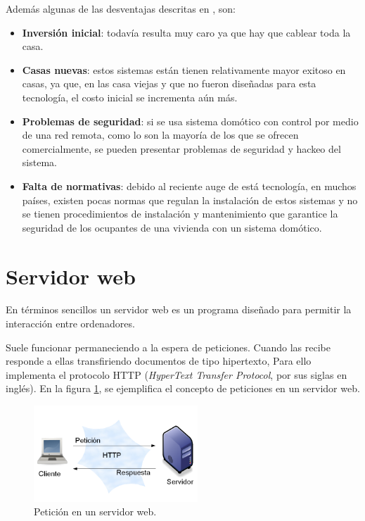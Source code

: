 Además algunas de las desventajas descritas en \cite{Madrid2007}, son:
\begin{itemize}
\item \textbf{Inversión inicial}: todavía resulta muy caro ya que hay que cablear toda la casa.
\item \textbf{Casas nuevas}: estos sistemas están tienen relativamente mayor exitoso en casas, ya que, en las casa viejas y que no fueron diseñadas para esta tecnología, el costo inicial se incrementa aún más. 
\item \textbf{Problemas de seguridad}: si se usa sistema domótico con control por medio de una red remota, como lo son la mayoría de los que se ofrecen comercialmente, se pueden presentar problemas de seguridad y hackeo del sistema.
\item \textbf{Falta de normativas}: debido al reciente auge de está tecnología, en muchos países, existen pocas normas que regulan la instalación de estos sistemas y no se tienen procedimientos de instalación y mantenimiento que garantice la seguridad de los ocupantes de una vivienda con un sistema domótico.
\end{itemize}

\section{Servidor web}

En términos sencillos un servidor web es un programa diseñado para permitir la interacción entre ordenadores.

Suele funcionar permaneciendo a la espera de peticiones. Cuando las recibe responde a ellas transfiriendo documentos de tipo hipertexto, Para ello implementa el protocolo HTTP (\textit{HyperText Transfer Protocol}, por sus siglas en inglés). En la figura \ref{F:peticion}, se ejemplifica el concepto de peticiones en un servidor web.

\begin{figure}[H]
\centering
\includegraphics[width=0.55\textwidth]{./imagenes/teoria/peticion.png} 
\caption{Petición en un servidor web.}
\label{F:peticion}
\end{figure}

